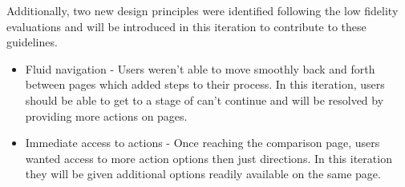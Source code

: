 \documentclass[a4 paper, 12pt]{article}
\begin{document}
    Additionally, two new design principles were identified following the low fidelity evaluations and will be introduced in this iteration to contribute to these guidelines. 
        \begin{itemize}
            \item Fluid navigation - Users weren't able to move smoothly back and forth between pages which added steps to their process. In this iteration, users should be able to get to a stage of can't continue and will be resolved by providing more actions on pages.
            \item Immediate access to actions - Once reaching the comparison page, users wanted access to more action options then just directions. In this iteration they will be given additional options readily available on the same page.
        \end{itemize}
\end{document}
